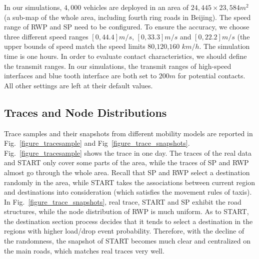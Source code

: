 In our simulations, $4,000$ vehicles are deployed in an area of $24,445\times 23,584 m^2$ (a sub-map of the whole area, including fourth ring roads in Beijing). The speed range of RWP and SP need to be configured.
To ensure the accuracy, we choose three different speed ranges $[0,44.4]m/s$, $[0,33.3]m/s$ and $[0,22.2]m/s$ (the upper bounds of speed match the speed limits $80$,$120$,$160$ $km/h$. 
The simulation time is one hours.
In order to evaluate contact characteristics, we should define the transmit ranges.
In our simulations, the transmit ranges of high-speed interfaces and blue tooth interface are both set to $200m$ for potential contacts.
All other settings are left at their default values.

\subsection{Traces and Node Distributions}

Trace samples and their snapshots from different mobility models are reported in Fig.~\ref{figure_tracesample} and Fig~\ref{figure_trace_snapshots}. Fig.~\ref{figure_tracesample} shows the trace in one day. The traces of the real data and START only cover some parts of the area, while the traces of SP and RWP almost go through the whole area. Recall that SP and RWP select a destination randomly in the area, while START takes the associations between current region and destinations into consideration (which satisfies the movement rules of taxis). In Fig.~\ref{figure_trace_snapshots}, real trace, START and SP exhibit the road structures, while the node distribution of RWP is much uniform. As to START, the destination section process decides that it tends to select a destination in the regions with higher load/drop event probability. Therefore, with the decline of the randomness, the snapshot of START becomes much clear and centralized on the main roads, which matches real traces very well.


